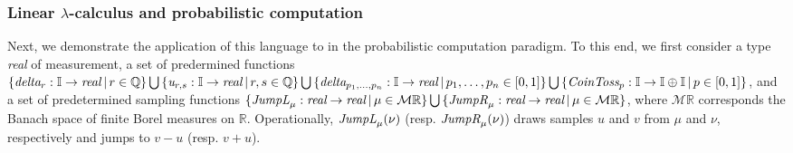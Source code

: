 \documentclass[10pt,a4paper]{amsart}
\theoremstyle{definition}
\theoremstyle{definition}
\theoremstyle{definition}
\theoremstyle{definition}
\theoremstyle{definition}
\theoremstyle{definition}
\begin{document}
\subsubsection{Linear $\lambda$-calculus and probabilistic computation} \label{subsec:syntax_pc}
Next, we demonstrate the application of this language to in the probabilistic computation paradigm. To this end, we first consider a type \emph{real} of measurement, a set of predermined functions 
$\{\emph{delta}_r: \mathbb{I} \to \emph{real} \hspace{2pt} \vert \, r \in \mathbb{Q} \} 
\bigcup \, \{ \emph{u}_{r,s}: \mathbb{I} \to \emph{real} \hspace{2pt} \vert \, r,s \in \mathbb{Q} \}
\bigcup \, \{ \emph{delta}_{p_1,\ldots,p_n}: \mathbb{I} \to \emph{real} \hspace{2pt} \vert \, p_1,\ldots,p_n  \in [0,1] \}  
\bigcup \, \{\emph{CoinToss}_p: \mathbb{I} \to \mathbb{I} \oplus \mathbb{I} \hspace{2pt} \vert \, p \in [0,1] \} $,  
and a set of predetermined sampling functions 
$ \{\emph{JumpL}_\mu: \emph{real}  \to \emph{real} \hspace{2pt} \vert \, \mu \in \mathcal{M}\mathbb{R} \} 
\bigcup \, \{\emph{JumpR}_\mu: \emph{real}  \to \emph{real} \hspace{2pt} \vert \, \mu \in \mathcal{M}\mathbb{R} \}$, where $\mathcal{M}\mathbb{R}$ corresponds the Banach space of finite Borel measures on $\mathbb{R}$.  Operationally, $\emph{JumpL}_\mu (\nu)$ (resp. $\emph{JumpR}_\mu (\nu)$) draws samples $u$ and $v$ from $\mu$ and $\nu$, respectively and jumps to $v-u$ (resp. $v+u$).
\end{document}

